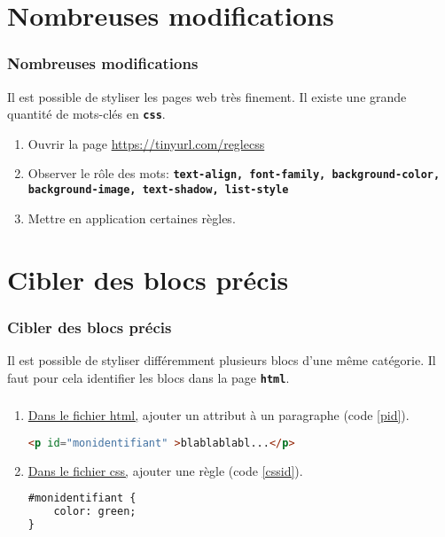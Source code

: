 \documentclass[svgnames,11pt]{beamer}
\begin{document}
\section{Nombreuses modifications}
\begin{frame}
    \frametitle{Nombreuses modifications}

Il est possible de styliser les pages web très finement. Il existe une grande quantité de mots-clés en \textbf{\texttt{css}}.
\begin{activite}
\begin{enumerate}
    \item Ouvrir la page \url{https://tinyurl.com/reglecss}
    \item Observer le rôle des mots: \textbf{\texttt{text-align, font-family, background-color, background-image, text-shadow, list-style}}
    \item Mettre en application certaines règles.
\end{enumerate}
\end{activite}

\end{frame}
\section{Cibler des blocs précis}
\begin{frame}
    \frametitle{Cibler des blocs précis}

    \begin{aretenir}[]
        Il est possible de styliser différemment plusieurs blocs d'une même catégorie. Il faut pour cela identifier les blocs dans la page \textbf{\texttt{html}}.
    \end{aretenir}
\end{frame}
\begin{frame}[fragile]
    \frametitle{}

    
\begin{activite}
    \begin{enumerate}
        \item \underline{Dans le fichier html,} ajouter un attribut à un paragraphe (code \ref{pid}).
        \begin{center}
            \begin{lstlisting}[language=HTML , basicstyle=\ttfamily\small, xleftmargin=1em, xrightmargin=0em]
<p id="monidentifiant" >blablablabl...</p>
\end{lstlisting}
\label{pid}
\end{center}
\item \underline{Dans le fichier css,} ajouter une règle (code \ref{cssid}).
\begin{center}
    \begin{lstlisting}[language=HTML , basicstyle=\ttfamily\small, xleftmargin=1em, xrightmargin=0em]
#monidentifiant {
    color: green;
}
\end{lstlisting}
\label{cssid}
\end{center}
    \end{enumerate}
    \end{activite}

\end{frame}
\end{document}
